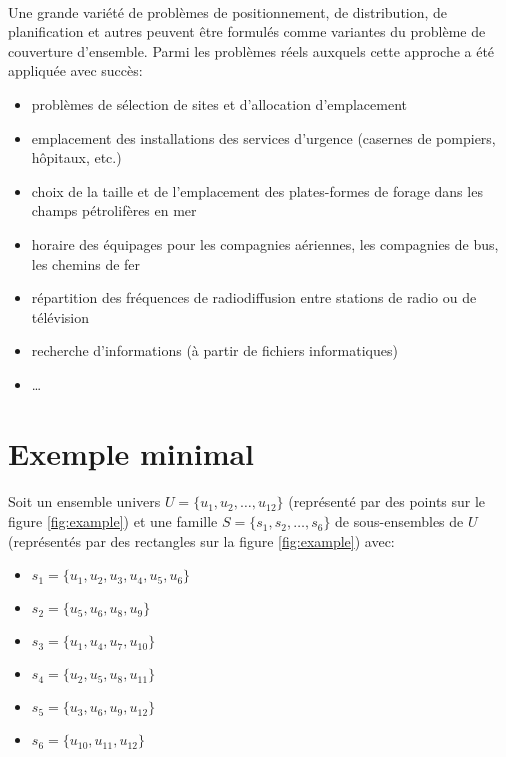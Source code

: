 \documentclass[12pt,letterpaper,twoside]{article}
\begin{document}
			\paragraph*{}
				Une grande variété de problèmes de positionnement, de distribution, de planification et autres peuvent être formulés comme variantes du problème de couverture d'ensemble. Parmi les problèmes réels auxquels cette approche a été appliquée avec succès:\cite{Balas1982}
				\begin{itemize}
					\item problèmes de sélection de sites et d'allocation d'emplacement
					\item emplacement des installations des services d'urgence (casernes de pompiers, hôpitaux, etc.)
					\item choix de la taille et de l'emplacement des plates-formes de forage dans les champs pétrolifères en mer
					\item horaire des équipages pour les compagnies aériennes, les compagnies de bus, les chemins de fer
					\item répartition des fréquences de radiodiffusion entre stations de radio ou de télévision
					\item recherche d'informations (à partir de fichiers informatiques)
					\item \ldots
				\end{itemize}
	\section{Exemple minimal}
		\paragraph*{}
			Soit un ensemble univers \(U = \{u_1, u_2, \dots, u_{12}\}\) (représenté par des points sur le figure \ref{fig:example}) et une famille \(S = \{s_1, s_2, \dots, s_6\}\) de sous-ensembles de \(U\) (représentés par des rectangles sur la figure \ref{fig:example}) avec:
			\begin{itemize}
				\item \(s_1 = \{u_1, u_2, u_3, u_4, u_5, u_6\}\)
				\item \(s_2 = \{u_5, u_6, u_8, u_9\}\)
				\item \(s_3 = \{u_1, u_4, u_7, u_{10}\}\)
				\item \(s_4 = \{u_2, u_5, u_8, u_{11}\}\)
				\item \(s_5 = \{u_3, u_6, u_9, u_{12}\}\)
				\item \(s_6 = \{u_{10}, u_{11}, u_{12}\}\)
			\end{itemize}
\end{document}

